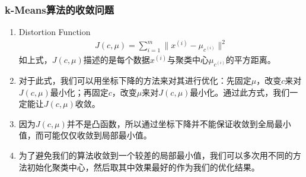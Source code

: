 \subsubsection{k-Means算法的收敛问题}
\begin{enumerate}
	\item Distortion Function
	\begin{align}
		J(c, \mu) = \sum_{i=1}^{m} \|x^{(i)} - \mu_{c^{(i)}}\|^2
	\end{align}
	如上式，$J(c, \mu)$描述的是每个数据$x^{(i)}$与聚类中心$\mu_{c^{(i)}}$的平方距离。
	\item 对于此式，我们可以用坐标下降的方法来对其进行优化：先固定$\mu$，改变$c$来对$J(c, \mu)$最小化；再固定$c$，改变$\mu$来对$J(c, \mu)$最小化。通过此方式，我们一定能让$J(c, \mu)$收敛。
	\item 因为$J(c, \mu)$并不是凸函数，所以通过坐标下降并不能保证收敛到全局最小值，而可能仅仅收敛到局部最小值。
	\item 为了避免我们的算法收敛到一个较差的局部最小值，我们可以多次用不同的方法初始化聚类中心，然后取其中效果最好的作为我们的优化结果。
\end{enumerate}












